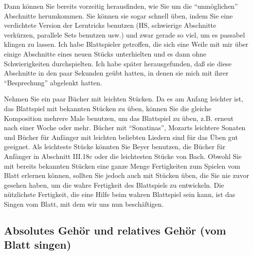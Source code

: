 Dann können Sie bereits vorzeitig herausfinden, wie Sie um die \enquote{unmöglichen} Abschnitte herumkommen.
Sie können sie sogar schnell üben, indem Sie eine verdichtete Version der Lerntricks benutzen (HS, schwierige Abschnitte verkürzen, parallele Sets benutzen usw.) und zwar gerade so viel, um es passabel klingen zu lassen.
Ich habe Blattspieler getroffen, die sich eine Weile mit mir über einige Abschnitte eines neuen Stücks unterhielten und es dann ohne Schwierigkeiten durchspielten.
Ich habe später herausgefunden, daß sie diese Abschnitte in den paar Sekunden geübt hatten, in denen sie mich mit ihrer \enquote{Besprechung} abgelenkt hatten.

Nehmen Sie ein paar Bücher mit leichten Stücken.
Da es am Anfang leichter ist, das Blattspiel mit bekannten Stücken zu üben, können Sie die gleiche Komposition mehrere Male benutzen, um das Blattspiel zu üben, z.B. erneut nach einer Woche oder mehr.
Bücher mit \enquote{Sonatinas}, Mozarts leichtere Sonaten und Bücher für Anfänger mit leichten beliebten Liedern sind für das Üben gut geeignet.
Als leichteste Stücke könnten Sie Beyer benutzen, die Bücher für Anfänger in Abschnitt III.18c oder die leichtesten Stücke von Bach. 
Obwohl Sie mit bereits bekannten Stücken eine ganze Menge Fertigkeiten zum Spielen vom Blatt erlernen können, sollten Sie jedoch auch mit Stücken üben, die Sie nie zuvor gesehen haben, um die wahre Fertigkeit des Blattspiels zu entwickeln.
Die nützlichste Fertigkeit, die eine Hilfe beim wahren Blattspiel sein kann, ist das Singen vom Blatt, mit dem wir uns nun beschäftigen.


\subsection{Absolutes Gehör und relatives Gehör (vom Blatt singen)}
\label{c1iii12}

